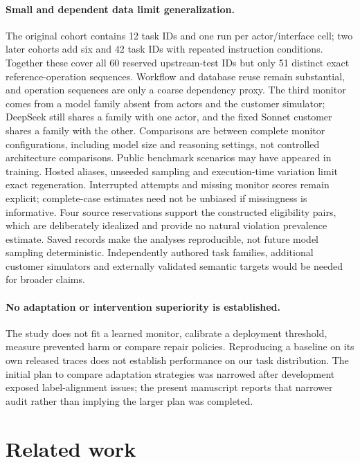 \documentclass[10pt]{article}
\begin{document}
\paragraph{Small and dependent data limit generalization.}
The original cohort contains 12 task IDs and one run per actor/interface cell; two later cohorts add six and 42 task IDs with repeated instruction conditions. Together these cover all 60 reserved upstream-test IDs but only 51 distinct exact reference-operation sequences. Workflow and database reuse remain substantial, and operation sequences are only a coarse dependency proxy. The third monitor comes from a model family absent from actors and the customer simulator; DeepSeek still shares a family with one actor, and the fixed Sonnet customer shares a family with the other. Comparisons are between complete monitor configurations, including model size and reasoning settings, not controlled architecture comparisons. Public benchmark scenarios may have appeared in training. Hosted aliases, unseeded sampling and execution-time variation limit exact regeneration. Interrupted attempts and missing monitor scores remain explicit; complete-case estimates need not be unbiased if missingness is informative. Four source reservations support the constructed eligibility pairs, which are deliberately idealized and provide no natural violation prevalence estimate. Saved records make the analyses reproducible, not future model sampling deterministic. Independently authored task families, additional customer simulators and externally validated semantic targets would be needed for broader claims.

\paragraph{No adaptation or intervention superiority is established.}
The study does not fit a learned monitor, calibrate a deployment threshold, measure prevented harm or compare repair policies. Reproducing a baseline on its own released traces does not establish performance on our task distribution. The initial plan to compare adaptation strategies was narrowed after development exposed label-alignment issues; the present manuscript reports that narrower audit rather than implying the larger plan was completed.

\section{Related work}
\label{sec:related}
\end{document}
